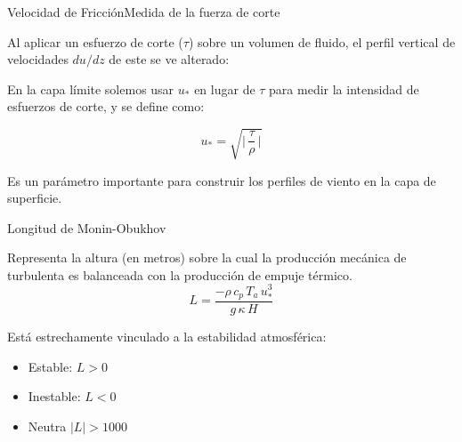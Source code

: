 \begin{frame}{Velocidad de Fricción}{Medida de la fuerza de corte}
 
Al aplicar un esfuerzo de corte ($\tau$) sobre un volumen de fluido, el perfil vertical de velocidades $du/dz$ de este se ve alterado:
 
    \begin{center}
    \end{center}
 
\pause
 
En la capa límite solemos usar $u_*$ en lugar de $\tau$ para medir la intensidad de esfuerzos de corte, y se define como:
 
$$\boxed{ u_* = \sqrt{\bigg|\, \dfrac{\tau}{\rho}\,\bigg|} }$$
 
Es un parámetro importante para construir los perfiles de viento en la capa de superficie.
\end{frame}



\begin{frame}{Longitud de Monin-Obukhov}

    Representa la altura (en metros) sobre la cual la producción mecánica de turbulenta es balanceada con la producción de empuje térmico.
    $$\boxed{
        L=\dfrac{-\rho \,c_p\,T_a\,u_*^3 }{g\,\kappa\,H}
        }
    $$
 
 Está estrechamente vinculado a la estabilidad atmosférica:
    \begin{itemize}
        \item Estable: $L > 0$ %
        \item Inestable: $L < 0$ %
        \item Neutra $|L| > 1000$
    \end{itemize}
    
\end{frame}

